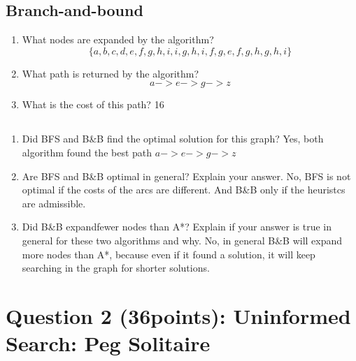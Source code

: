 \documentclass{article}
\def\ans#1{{\color{ans}#1}}
\newcommand{\centerfig}[2]{\begin{center}\texttt{[image: \#2]}\end{center}}
\begin{document}
\subsection{Branch-and-bound}
\begin{enumerate}[label=(\alph*)]
    \item What nodes are expanded by the algorithm?
    \ans{
        \[\{a, b, c, d, e, f, g, h, i, i, g, h, i, f, g, e, f, g, h, g, h, i\}\]
    }
    \item What path is returned by the algorithm?
    \ans{
        \[a->e->g->z\]
    }
    \item What is the cost of this path?
    \ans{
        16
    }
\end{enumerate}

\subsection{}

\begin{enumerate}[label=(\alph*)]
    \item Did BFS and B\&B find the optimal solution for this graph?
    \ans{
        Yes, both algorithm found the best path $a->e->g->z$
    }
    \item Are BFS and B\&B optimal in general? Explain your answer. 
    \ans{
        No, BFS is not optimal if the costs of the arcs are different. And B\&B only if 
        the heuristcs are admissible.
    }
    \item Did B\&B expandfewer nodes than A*? Explain if your answer is true in general for these two algorithms and why.
    \ans{
        No, in general B\&B will expand more nodes than A*, because even if it found a solution, it 
        will keep searching in the graph for shorter solutions.
    }
\end{enumerate}


\clearpage
\section{Question 2 (36points): Uninformed Search: Peg Solitaire}
\end{document}
